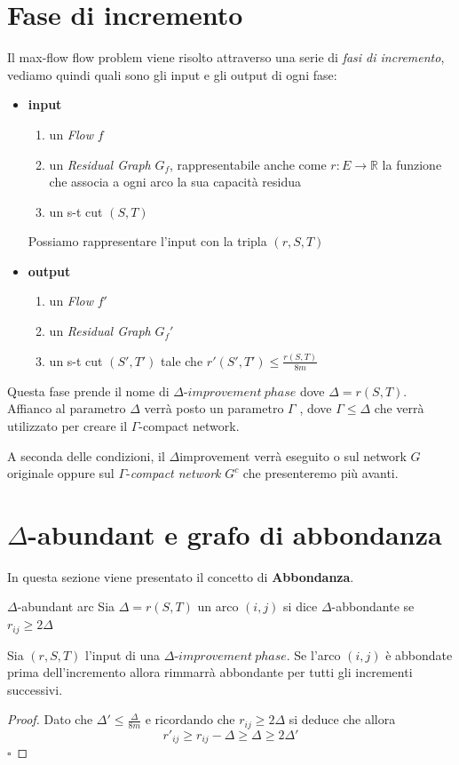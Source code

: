 \documentclass[a4paper, 11pt]{report}
\newcommand*{\QED}{\null\nobreak\hfill\ensuremath{\square}}%
\newcommand{\dlt}{$\Delta$}
\newcommand{\gmm}{$\Gamma$}
\begin{document}
\section{Fase di incremento}
Il max-flow flow problem viene risolto attraverso una serie di \textit{fasi di incremento}, vediamo quindi quali sono gli input e gli output di ogni fase:
\begin{itemize}[itemsep=0.5ex]
    \item \textbf{input}
    \begin{enumerate}
        \item un \textit{Flow} $f$
        \item un \textit{Residual Graph} $G_f$, rappresentabile anche come $r: E \rightarrow \mathbb{R}$ la funzione che associa a ogni arco la sua capacità residua
        \item un s-t cut $(S,T)$
    \end{enumerate}
    Possiamo rappresentare l'input con la tripla $(r,S,T)$
    \item \textbf{output}
    \begin{enumerate}
        \item un \textit{Flow} $f'$
        \item un \textit{Residual Graph} $G_f'$
        \item un s-t cut $(S',T')$ tale che $r'(S',T') \le \frac{r(S,T)}{8m}$
    \end{enumerate}
\end{itemize}
Questa fase prende il nome di $\Delta\text{-}improvement\ phase$ dove $\Delta = r(S,T)$.
Affianco al parametro $\Delta$ verrà posto un parametro $\Gamma$ , dove $\Gamma \le \Delta$ che verrà utilizzato per creare il $\Gamma$-compact network. 

A seconda delle condizioni, il \dlt improvement verrà eseguito o sul network $G$ originale oppure sul \gmm-\textit{compact network} $G^c$ che presenteremo più avanti.

\section{$\Delta$-abundant e grafo di abbondanza}
In questa sezione viene presentato il concetto di \textbf{Abbondanza}.

\begin{definition}{$\Delta$-abundant arc}{}
    Sia $\Delta = r(S,T)$ un arco $(i,j)$ si dice $\Delta$-abbondante se $r_{ij} \ge 2\Delta$ 
     
\end{definition}
\begin{lemma}[label = ab4ever]{}{}
    
    Sia $(r,S,T)$ l'input di una $\Delta\text{-}improvement\ phase$. Se l'arco $(i,j)$ è abbondate prima dell'incremento allora rimmarrà abbondante per tutti gli incrementi successivi.
\end{lemma}
\begin{proof}
    Dato che 
    $\Delta' \le \frac{\Delta}{8m} $ e ricordando che $r_{ij} \ge 2\Delta $ si deduce che 
    allora \[r'_{ij} \ge r_{ij}-\Delta \ge\Delta\ge  2\Delta'\]\QED
\end{proof}
\end{document}
